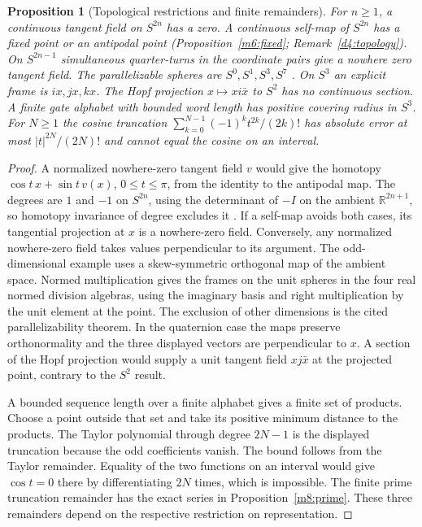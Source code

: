 \documentclass[11pt,reqno]{amsart}
\newtheorem{proposition}[theorem]{Proposition}
\theoremstyle{definition}
\theoremstyle{remark}
\numberwithin{equation}{section}
\begin{document}
\begin{proposition}[Topological restrictions and finite remainders]\label{m8:topology}
For $n\ge1$, a continuous tangent field on $S^{2n}$ has a zero.
A continuous self-map of $S^{2n}$ has a fixed point or an antipodal
point (Proposition~\ref{m6:fixed}; Remark~\ref{d4:topology}). On $S^{2n-1}$ simultaneous quarter-turns in the coordinate
pairs give a nowhere zero tangent field. The parallelizable
spheres are $S^0,S^1,S^3,S^7$ \cite{m8:bott,m8:kervaire}.
On $S^3$ an explicit frame is $ix,jx,kx$.
The Hopf projection $x\mapsto xi\bar x$ to $S^2$ has no continuous
section.
A finite gate alphabet with bounded word length has positive
covering radius in $S^3$. For $N\ge1$ the cosine truncation
$\sum_{k=0}^{N-1}(-1)^k t^{2k}/(2k)!$ has absolute error at most
$|t|^{2N}/(2N)!$ and cannot equal the cosine on an interval.
\end{proposition}
\begin{proof}
A normalized nowhere-zero tangent field $v$ would give the
homotopy $\cos t\,x+\sin t\,v(x)$, $0\le t\le\pi$, from the
identity to the antipodal map. The degrees are $1$ and $-1$
on $S^{2n}$, using the determinant of $-I$ on the ambient
$\mathbb R^{2n+1}$, so homotopy invariance of degree excludes it
\cite[Section 2.2]{Hatcher}. If a self-map avoids both cases,
its tangential projection at $x$ is a nowhere-zero field.
Conversely, any normalized nowhere-zero field takes values
perpendicular to its argument. The odd-dimensional example
uses a skew-symmetric orthogonal map of the ambient space.
Normed multiplication gives the frames on the unit spheres
in the four real normed division algebras, using the imaginary
basis and right multiplication by the unit element at the
point. The exclusion of other dimensions is the cited
parallelizability theorem. In the quaternion case the maps
preserve orthonormality and the three displayed vectors are
perpendicular to $x$. A section of the Hopf projection would
supply a unit tangent field $xj\bar x$ at the projected point,
contrary to the $S^2$ result.

A bounded sequence length over a finite alphabet gives a finite
set of products. Choose a point outside that set and take its
positive minimum distance to the products. The Taylor
polynomial through degree $2N-1$ is the displayed truncation
because the odd coefficients vanish. The bound follows from
the Taylor remainder. Equality of the two functions on an
interval would give $\cos t=0$ there by differentiating $2N$
times, which is impossible.
The finite prime truncation remainder has the exact series in
Proposition~\ref{m8:prime}. These three remainders depend on the
respective restriction on representation.
\end{proof}
\end{document}
